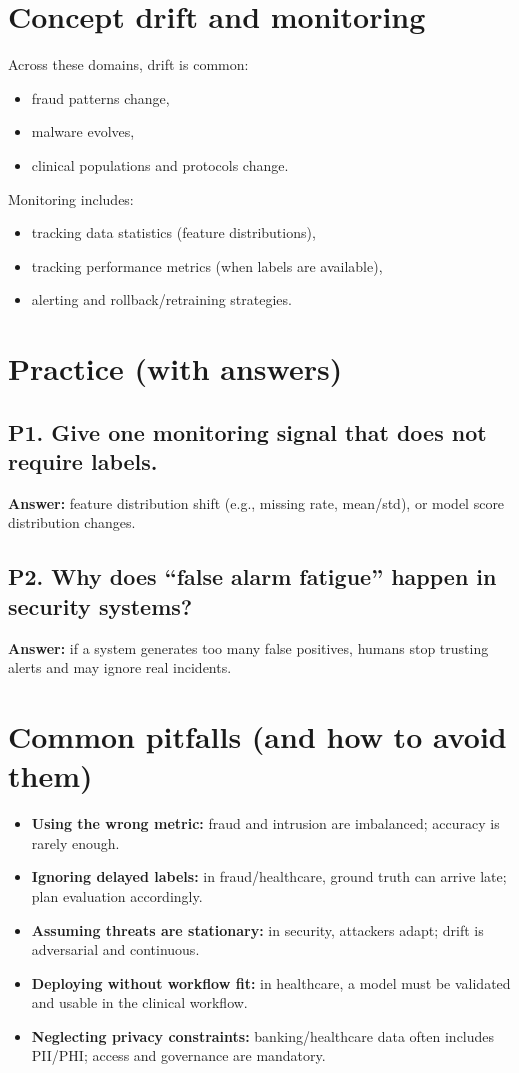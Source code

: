 \documentclass[11pt]{article}
\begin{document}
\section{Concept drift and monitoring}
Across these domains, drift is common:
\begin{itemize}[leftmargin=*]
  \item fraud patterns change,
  \item malware evolves,
  \item clinical populations and protocols change.
\end{itemize}
Monitoring includes:
\begin{itemize}[leftmargin=*]
  \item tracking data statistics (feature distributions),
  \item tracking performance metrics (when labels are available),
  \item alerting and rollback/retraining strategies.
\end{itemize}

\section{Practice (with answers)}
\subsection*{P1. Give one monitoring signal that does not require labels.}
\textbf{Answer:} feature distribution shift (e.g., missing rate, mean/std), or model score distribution changes.

\subsection*{P2. Why does ``false alarm fatigue'' happen in security systems?}
\textbf{Answer:} if a system generates too many false positives, humans stop trusting alerts and may ignore real incidents.

\section{Common pitfalls (and how to avoid them)}
\begin{itemize}[leftmargin=*]
  \item \textbf{Using the wrong metric:} fraud and intrusion are imbalanced; accuracy is rarely enough.
  \item \textbf{Ignoring delayed labels:} in fraud/healthcare, ground truth can arrive late; plan evaluation accordingly.
  \item \textbf{Assuming threats are stationary:} in security, attackers adapt; drift is adversarial and continuous.
  \item \textbf{Deploying without workflow fit:} in healthcare, a model must be validated and usable in the clinical workflow.
  \item \textbf{Neglecting privacy constraints:} banking/healthcare data often includes PII/PHI; access and governance are mandatory.
\end{itemize}
\end{document}
